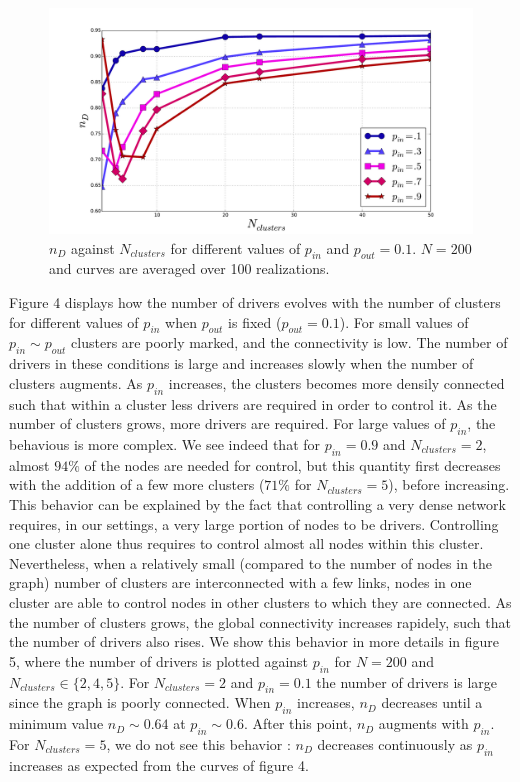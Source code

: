 \documentclass[conference]{IEEEtran}
\begin{document}
\begin{figure}
\label{fig:block_model_1}
\includegraphics[scale=.25]{./figure_5/figure_5}
\caption{$n_D$ against $N_{clusters} $ for different values of $ p_{in} $ and $ p_{out} = 0.1 $. $ N=200 $ and curves are averaged over 100 realizations.}
\end{figure}

Figure 4 displays how the number of drivers evolves with the number of clusters for different values of $ p_{in} $ when $ p_{out} $ is fixed ($p_{out} =0.1$). For small values of $ p_{in} \sim p_{out} $ clusters are poorly marked, and the connectivity is low. The number of drivers in these conditions is large and increases slowly when the number of clusters augments. As $ p_{in} $ increases, the clusters becomes more densily connected such that within a cluster less drivers are required in order to control it. As the number of clusters grows, more drivers are required. For large values of $p_{in} $, the behavious is more complex. We see indeed that for $p_{in} = 0.9 $ and $N_{clusters} = 2$, almost $ 94\% $ of the nodes are needed for control, but this quantity first decreases with the addition of a few more clusters ($ 71\% $ for $ N_{clusters}=5 $), before increasing. This behavior can be explained by the fact that controlling a very dense network requires, in our settings, a very large portion of nodes to be drivers. Controlling one cluster alone thus requires to control almost all nodes within this cluster. Nevertheless, when a relatively small (compared to the number of nodes in the graph) number of clusters are interconnected with a few links, nodes in one cluster are able to control nodes in other clusters to which they are connected. As the number of clusters grows, the global connectivity increases rapidely, such that the number of drivers also rises. We show this behavior in more details in figure 5, where the number of drivers is plotted against $ p_{in} $ for $N=200$ and $N_{clusters} \in \{2,4,5\} $. For $N_{clusters} = 2 $ and $ p_{in} = 0.1 $ the number of drivers is large since the graph is poorly connected. When $p_{in} $ increases, $n_D$ decreases until a minimum value $n_D \sim 0.64 $ at $ p_{in} \sim 0.6 $. After this point, $n_D$ augments with $p_{in}$. For $N_{clusters} = 5 $, we do not see this behavior : $ n_D $ decreases continuously as $p_{in} $ increases as expected from the curves of figure 4.
\end{document}
